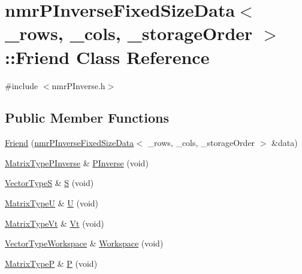 \hypertarget{classnmr_p_inverse_fixed_size_data_1_1_friend}{\section{nmr\-P\-Inverse\-Fixed\-Size\-Data$<$ \-\_\-rows, \-\_\-cols, \-\_\-storage\-Order $>$\-:\-:Friend Class Reference}
\label{classnmr_p_inverse_fixed_size_data_1_1_friend}
}


{\ttfamily \#include $<$nmr\-P\-Inverse.\-h$>$}

\subsection*{Public Member Functions}
\begin{DoxyCompactItemize}
\item 
\hyperlink{classnmr_p_inverse_fixed_size_data_1_1_friend_ab84ac37b92863bfb1ab0e36ef06ca256}{Friend} (\hyperlink{classnmr_p_inverse_fixed_size_data}{nmr\-P\-Inverse\-Fixed\-Size\-Data}$<$ \-\_\-rows, \-\_\-cols, \-\_\-storage\-Order $>$ \&data)
\item 
\hyperlink{classnmr_p_inverse_fixed_size_data_a6c4787ecd9e2e7155fd857fb4427c7b0}{Matrix\-Type\-P\-Inverse} \& \hyperlink{classnmr_p_inverse_fixed_size_data_1_1_friend_a4229fbafa1416c02707d0c58191cff6d}{P\-Inverse} (void)
\item 
\hyperlink{classnmr_p_inverse_fixed_size_data_a55ba424dddf7bd0797b80bc468a209b0}{Vector\-Type\-S} \& \hyperlink{classnmr_p_inverse_fixed_size_data_1_1_friend_a70567ca6c311ff9dd7c094ceb7b960d7}{S} (void)
\item 
\hyperlink{classnmr_p_inverse_fixed_size_data_aef6864d119646cca01fc7a27d9eec4fa}{Matrix\-Type\-U} \& \hyperlink{classnmr_p_inverse_fixed_size_data_1_1_friend_a212ee77c8a20039c4afe9905b191a03c}{U} (void)
\item 
\hyperlink{classnmr_p_inverse_fixed_size_data_a61bc7c8325cf61f5c530759364ce185a}{Matrix\-Type\-Vt} \& \hyperlink{classnmr_p_inverse_fixed_size_data_1_1_friend_aaf7188adc3c6611172d7c21c4658cb83}{Vt} (void)
\item 
\hyperlink{classnmr_p_inverse_fixed_size_data_a801f15c74e8a0884df8cbee5fe0ed052}{Vector\-Type\-Workspace} \& \hyperlink{classnmr_p_inverse_fixed_size_data_1_1_friend_acccd136a3d02a84adf93ffec8da8b2ac}{Workspace} (void)
\item 
\hyperlink{classnmr_p_inverse_fixed_size_data_abbeb86284eb856bc18f108e80906b04d}{Matrix\-Type\-P} \& \hyperlink{classnmr_p_inverse_fixed_size_data_1_1_friend_a57dca191623c0bbf5b8f3bf5be2d2f72}{P} (void)
\end{DoxyCompactItemize}



